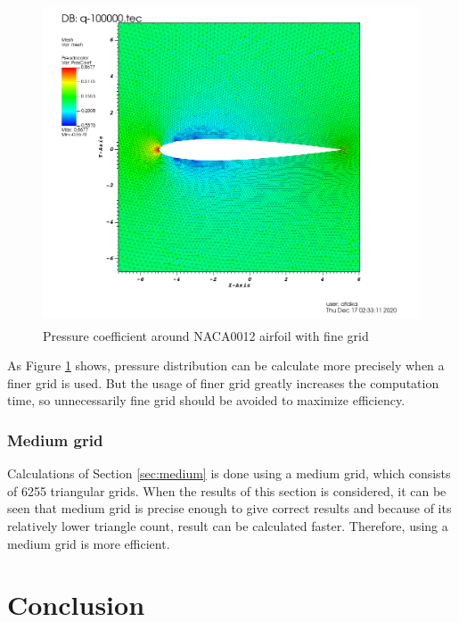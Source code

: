\documentclass[letterpaper,12pt]{article}
\begin{document}
\vspace{1cm}

\begin{figure} [!h]
	\centering
	\includegraphics[height = 9.5cm]{graph/fine/fine_pressure0000.png}
	\caption{Pressure coefficient around NACA0012 airfoil with fine grid}
    \label{fig:airfoilfinepressure}
\end{figure}

\vspace{1cm}

As Figure \ref{fig:airfoilfinepressure} shows, pressure distribution can be 
calculate more precisely when a finer grid is used. But the usage of finer grid
greatly increases the computation time, so unnecessarily fine grid should be avoided 
to maximize efficiency.

\subsubsection{Medium grid}

Calculations of Section \ref{sec:medium} is done using a medium grid, which consists of 
6255 triangular grids. When the results of this section is considered, it can be seen that
medium grid is precise enough to give correct results and because of its relatively lower triangle count, result
can be calculated faster. Therefore, using a medium grid is more efficient.

\newpage

\section{Conclusion}
\end{document}
